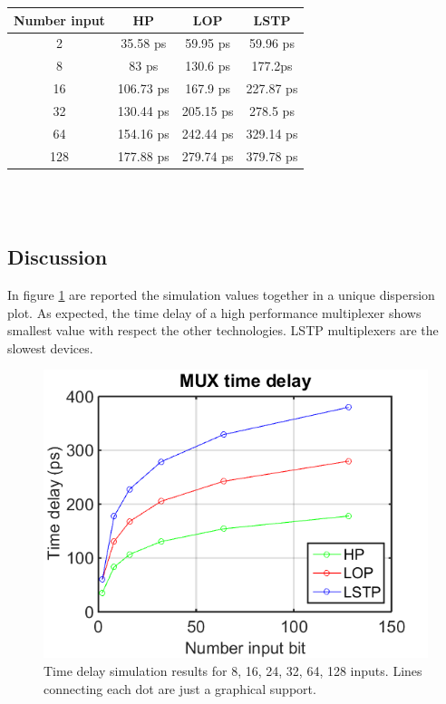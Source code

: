 \begin{tabular}{cccc}
	
	\cline{1-4}
	Number input    & HP & LOP & LSTP\\
	\hline
	2      & 35.58 ps    & 59.95 ps  &  59.96 ps  \\
	8  	  & 83 ps      & 130.6 ps    & 177.2ps  \\
	16       & 106.73 ps     & 167.9 ps    & 227.87 ps \\
	32       & 130.44 ps    & 205.15 ps     & 278.5 ps \\
	64 & 154.16 ps      & 242.44 ps      & 329.14 ps\\
	128 & 177.88 ps      & 279.74 ps     & 379.78 ps\\
	\hline
\end{tabular}
\\ \\
\subsection{Discussion}
In figure \ref{fig:time} are reported the simulation values together in a unique dispersion plot. As expected, the time delay of a high performance multiplexer shows smallest value with respect the other technologies. LSTP multiplexers are the slowest devices.
\begin{figure}[!]
	\centering
	\includegraphics[scale =1]{capitoli/time}
	\caption{Time delay simulation results for 8, 16, 24, 32, 64, 128 inputs. Lines connecting each dot are just a graphical support.}
	\label{fig:time}
\end{figure}
\newpage

